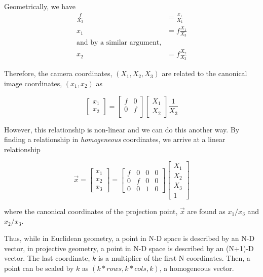\documentclass[11pt,a4paper]{article}
\begin{document}
Geometrically, we have 
\begin{align*}
\frac{f}{X_3} &= \frac{x_1}{X_1} \\
x_1 &= f\frac{X_1}{X_3} \\
\text{and by a similar argument,} \\
x_2 &= f\frac{X_2}{X_3}
\end{align*}

Therefore, the camera coordinates, $(X_1, X_2, X_3)$ are related to the canonical image coordinates, $(x_1, x_2)$ as

\begin{equation}
	\begin{bmatrix}
		x_1 \\
		x_2
	\end{bmatrix}
	=
	\begin{bmatrix}
		f & 0 \\
		0 & f \\
	\end{bmatrix}
	\begin{bmatrix}
		X_1 \\
		X_2
	\end{bmatrix}
	\frac{1}{X_3}
\end{equation}

However, this relationship is non-linear and we can do this another way. By finding a relationship in \textit{homogeneous} coordinates, we arrive at a linear relationship

\begin{equation}
	\vec{x} = 
	\begin{bmatrix}
		x_1 \\
		x_2 \\
		x_3
	\end{bmatrix}
	=
	\begin{bmatrix}
		f & 0 & 0 & 0 \\
		0 & f & 0 & 0 \\
		0 & 0 & 1 & 0 
	\end{bmatrix}
	\begin{bmatrix}
		X_1 \\
		X_2 \\
		X_3 \\
		1
	\end{bmatrix}
\end{equation}

where the canonical coordinates of the projection point, $\vec{x}$ are found as $x_1/x_3$ and $x_2/x_3$.

Thus, while in Euclidean geometry, a point in N-D space is described by an N-D vector, in projective geometry, a point in N-D space is described by an (N+1)-D vector. The last coordinate, $k$ is a multiplier of the first N coordinates. Then, a point can be scaled by $k$ as $(k*rows, k*cols, k)$, a homogeneous vector.
\end{document}
